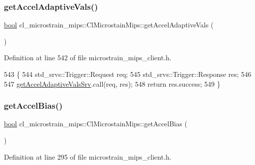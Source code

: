 \subsubsection{\texorpdfstring{get\+Accel\+Adaptive\+Vals()}{getAccelAdaptiveVals()}}
{\footnotesize\ttfamily \hyperlink{classbool}{bool} cl\+\_\+microstrain\+\_\+mips\+::\+Cl\+Microstain\+Mips\+::get\+Accel\+Adaptive\+Vals (\begin{DoxyParamCaption}{ }\end{DoxyParamCaption})\hspace{0.3cm}{\ttfamily [inline]}}



Definition at line 542 of file microstrain\+\_\+mips\+\_\+client.\+h.


\begin{DoxyCode}
543     \{
544         std\_srvs::Trigger::Request req;
545         std\_srvs::Trigger::Response res;
546 
547         \hyperlink{classcl__microstrain__mips_1_1ClMicrostainMips_a828f3b0adbfb1e6082fcaa1ce22928c0}{getAccelAdaptiveValsSrv}.call(req, res);
548         \textcolor{keywordflow}{return} res.success;
549     \}
\end{DoxyCode}
\mbox{\label{classcl__microstrain__mips_1_1ClMicrostainMips_a97ef55f8b10be52f44ae585ccd4e7db9}} 
\subsubsection{\texorpdfstring{get\+Accel\+Bias()}{getAccelBias()}}
{\footnotesize\ttfamily \hyperlink{classbool}{bool} cl\+\_\+microstrain\+\_\+mips\+::\+Cl\+Microstain\+Mips\+::get\+Accel\+Bias (\begin{DoxyParamCaption}{ }\end{DoxyParamCaption})\hspace{0.3cm}{\ttfamily [inline]}}



Definition at line 295 of file microstrain\+\_\+mips\+\_\+client.\+h.


